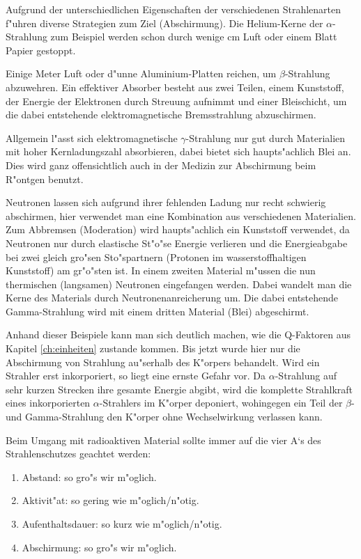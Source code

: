 \documentclass[12pt]{article}
\begin{document}
Aufgrund der unterschiedlichen Eigenschaften der verschiedenen Strahlenarten f"uhren diverse Strategien zum Ziel (Abschirmung). Die Helium-Kerne der $\alpha$-Strahlung zum Beispiel werden schon durch wenige $\si{\centi\meter}$ Luft oder einem Blatt Papier gestoppt. \par 
Einige Meter Luft oder d"unne Aluminium-Platten reichen, um $\beta$-Strahlung abzuwehren. Ein effektiver Absorber besteht aus zwei Teilen, einem Kunststoff, der Energie der Elektronen durch Streuung aufnimmt und einer Bleischicht, um die dabei entstehende elektromagnetische Bremsstrahlung abzuschirmen.
\par 
Allgemein l"asst sich elektromagnetische $\gamma$-Strahlung  nur gut durch Materialien mit hoher Kernladungszahl absorbieren, dabei bietet sich haupts"achlich Blei an. Dies wird ganz offensichtlich auch in der Medizin zur Abschirmung beim R"ontgen benutzt. \par  
Neutronen lassen sich aufgrund ihrer fehlenden Ladung nur recht schwierig abschirmen, hier verwendet man eine Kombination aus verschiedenen Materialien. Zum Abbremsen (Moderation) wird haupts"achlich ein Kunststoff verwendet, da Neutronen nur durch elastische St"o"se Energie verlieren und die Energieabgabe bei zwei gleich gro"sen Sto"spartnern (Protonen im wasserstoffhaltigen Kunststoff) am gr"o"sten ist. In einem zweiten Material m"ussen die nun thermischen (langsamen) Neutronen eingefangen werden. Dabei wandelt man die Kerne des Materials durch Neutronenanreicherung um. Die dabei entstehende Gamma-Strahlung wird mit einem dritten Material (Blei) abgeschirmt. \par 
Anhand dieser Beispiele kann man sich deutlich machen, wie die Q-Faktoren aus Kapitel \ref{ch:einheiten} zustande kommen. Bis jetzt wurde hier nur die Abschirmung von Strahlung au"serhalb des K"orpers behandelt. Wird ein Strahler erst inkorporiert, so liegt eine ernste Gefahr vor. Da $\alpha$-Strahlung auf sehr kurzen Strecken ihre gesamte Energie abgibt, wird die komplette Strahlkraft eines inkorporierten $\alpha$-Strahlers im K"orper deponiert, wohingegen ein Teil der $\beta$- und Gamma-Strahlung den K"orper ohne Wechselwirkung verlassen kann. \par 
Beim Umgang mit radioaktiven Material sollte immer auf die vier A`s des Strahlenschutzes geachtet werden:
\begin{enumerate}
	\item Abstand: so gro"s wir m"oglich. 
	\item Aktivit"at: so gering wie m"oglich/n"otig.
	\item Aufenthaltsdauer: so kurz wie m"oglich/n"otig.
	\item Abschirmung: so gro"s wir m"oglich.
\end{enumerate}
  
\end{document}
